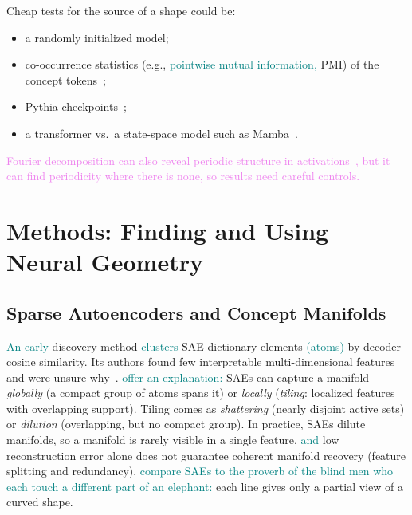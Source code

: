\documentclass[11pt,a4paper]{article}
\newcommand{\fromnotes}[1]{\textcolor{green!50!black}{#1}}
\newcommand{\fromold}[1]{\textcolor{violet}{#1}}
\newcommand{\fromclaude}[1]{\textcolor{orange!85!black}{#1}}
\newcommand{\fromprose}[1]{\textcolor{teal}{#1}}
\newcommand{\fromnotes}[1]{#1}
\newcommand{\fromold}[1]{#1}
\newcommand{\fromclaude}[1]{#1}
\newcommand{\fromprose}[1]{#1}
\begin{document}
\fromnotes{Cheap tests for the source of a shape could be:}
\begin{itemize}
  \item \fromnotes{a randomly initialized model;}
  \item \fromnotes{co-occurrence statistics (e.g., \fromprose{pointwise mutual information,} PMI) of the concept tokens~\cite{karkada2026symmetry,prieto2026correlations};}
  \item \fromnotes{Pythia checkpoints~\cite{biderman2023pythia};}
  \item \fromnotes{a transformer vs.\ a state-space model such as Mamba~\cite{gu2023mamba}.}
\end{itemize}
\fromold{Fourier decomposition can also reveal periodic structure in activations~\cite{feucht2026arithmetic}, but it can find periodicity where there is none, so results need careful controls.}

\section{Methods: Finding and Using Neural Geometry}

\subsection{Sparse Autoencoders and Concept Manifolds}
\fromprose{An early} discovery method \fromprose{clusters} SAE dictionary elements \fromprose{(atoms)} by decoder cosine similarity. Its authors found few interpretable multi-dimensional features and were unsure why~\cite{engels2025notall}.
\fromprose{\textcite{bhalla2026saemanifolds} offer an explanation:} SAEs can capture a manifold \emph{globally} (a compact group of atoms spans it) or \emph{locally} (\emph{tiling}: localized features with overlapping support). Tiling comes as \emph{shattering} (nearly disjoint active sets) or \emph{dilution} (overlapping, but no compact group).
In practice, SAEs dilute manifolds, so a manifold is rarely visible in a single feature, \fromprose{and} low reconstruction error alone does not guarantee coherent manifold recovery (feature splitting and redundancy).
\fromnotes{\fromprose{\textcite{bhalla2026blog} compare SAEs to the proverb of the blind men who each touch a different part of an elephant:} each line gives only a partial view of a curved shape.}
\end{document}
